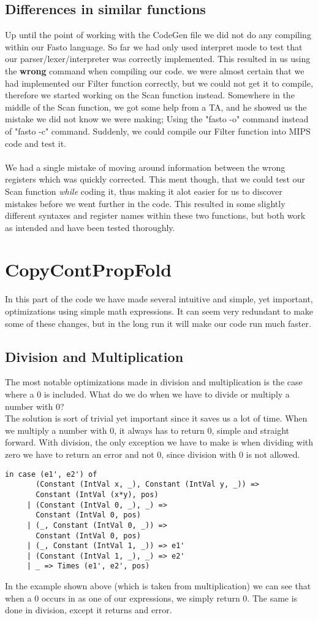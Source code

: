 \documentclass[12pt]{article}
\begin{document}
\subsection{Differences in similar functions}
Up until the point of working with the CodeGen file we did not do any compiling within our Fasto language. So far we had only used interpret mode to test that our parser/lexer/interpreter was correctly implemented. This resulted in us using the \textbf{wrong} command when compiling our code. we were almost certain that we had implemented our Filter function correctly, but we could not get it to compile, therefore we started working on the Scan function instead. Somewhere in the middle of the Scan function, we got some help from a TA, and he showed us the mistake we did not know we were making; Using the "fasto -o" command instead of "fasto -c" command. Suddenly, we could compile our Filter function into MIPS code and test it.\\\\ 
We had a single mistake of moving around information between the wrong registers which was quickly corrected. This ment though, that we could test our Scan function \textit{while} coding it, thus making it alot easier for us to discover mistakes before we went further in the code. This resulted in some slightly different syntaxes and register names within these two functions, but both work as intended and have been tested thoroughly. 

\section{CopyContPropFold}
In this part of the code we have made several intuitive and simple, yet important, optimizations using simple math expressions. It can seem very redundant to make some of these changes, but in the long run it will make our code run much faster.
\subsection{Division and Multiplication}
The most notable optimizations made in division and multiplication is the case where a 0 is included. What do we do when we have to divide or multiply a number with 0?\\
The solution is sort of trivial yet important since it saves us a lot of time. When we multiply a number with 0, it always has to return 0, simple and straight forward. With division, the only exception we have to make is when dividing with zero we have to return an error and not 0, since division with 0 is not allowed.
\begin{verbatim}
in case (e1', e2') of
       (Constant (IntVal x, _), Constant (IntVal y, _)) =>
       Constant (IntVal (x*y), pos)
     | (Constant (IntVal 0, _), _) =>
       Constant (IntVal 0, pos)
     | (_, Constant (IntVal 0, _)) =>
       Constant (IntVal 0, pos)
     | (_, Constant (IntVal 1, _)) => e1'
     | (Constant (IntVal 1, _), _) => e2'
     | _ => Times (e1', e2', pos)
\end{verbatim}
In the example shown above (which is taken from multiplication) we can see that when a 0 occurs in as one of our expressions, we simply return 0. The same is done in division, except it returns and error.
\end{document}
